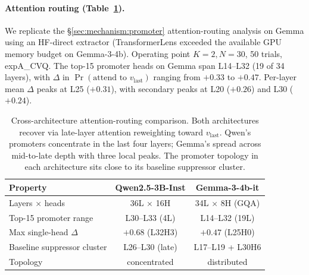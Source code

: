 \documentclass[11pt]{article}
\begin{document}
\begin{table}[t]
\centering
\scriptsize

\caption{Gemma-3-4b-it logit lens at L33 (final layer), baseline vs
LoRA, three cells. Bold $\Delta$ entries exclude zero. The pre-LoRA
$\Pr(v_{\mathrm{last}})$ at the final layer is $0.56$--$0.80$
across these cells (compared with $0.11$ in Qwen at $K{=}2, N{=}5$);
the post-LoRA value is $0.99$--$1.00$ across all three cells. The
starting points differ between architectures, but the post-LoRA
endpoints coincide.}
\label{tab:gemma_logit_lens}
\end{table}

\paragraph{Attention routing (Table~\ref{tab:gemma_routing}).}
We replicate the \S\ref{sec:mechanism:promoter} attention-routing
analysis on Gemma using an HF-direct extractor (TransformerLens
exceeded the available GPU memory budget on Gemma-3-4b). Operating
point $K{=}2, N{=}30$, 50 trials, expA\_CVQ. The top-15 promoter
heads on Gemma span L14--L32 (19 of 34 layers), with $\Delta$ in
$\Pr(\text{attend to }v_{\mathrm{last}})$ ranging from $+0.33$ to
$+0.47$. Per-layer mean $\Delta$ peaks at L25 ($+0.31$), with
secondary peaks at L20 ($+0.26$) and L30 ($+0.24$).

\begin{table}[!htbp]
\centering
\footnotesize
\setlength{\tabcolsep}{6pt}
\begin{tabular}{lcc}
\toprule
\textbf{Property} & \textbf{Qwen2.5-3B-Inst} & \textbf{Gemma-3-4b-it} \\
\midrule
Layers $\times$ heads        & 36L $\times$ 16H & 34L $\times$ 8H (GQA) \\
Top-15 promoter range        & L30--L33 (4L)    & L14--L32 (19L) \\
Max single-head $\Delta$     & $+0.68$ (L32H3)  & $+0.47$ (L25H0) \\
Baseline suppressor cluster  & L26--L30 (late)  & L17--L19 + L30H6 \\
Topology                     & concentrated     & distributed \\
\bottomrule
\end{tabular}
\caption{Cross-architecture attention-routing comparison. Both
architectures recover via late-layer attention reweighting toward
$v_{\mathrm{last}}$. Qwen's promoters concentrate in the last four
layers; Gemma's spread across mid-to-late depth with three local
peaks. The promoter topology in each architecture sits close to
its baseline suppressor cluster.}
\label{tab:gemma_routing}
\end{table}
\end{document}
